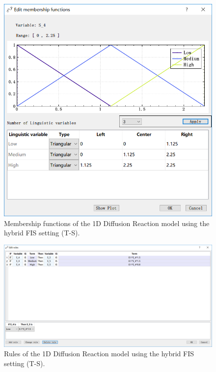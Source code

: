 \documentclass[journal,a4paper,onecolumn]{article}
\begin{document}
\begin{figure}[!hbt]
	\begin{center}
		\includegraphics[width=0.9\columnwidth]{fig39}
		\caption{Membership functions of the 1D Diffusion Reaction model using the hybrid FIS setting (T-S).}
		\label{fig:Membership functions of 1D Diffusion Reaction using hybrid FIS (T-S).}
	\end{center}
\end{figure}

\begin{figure}[!hbt]
	\begin{center}
		\includegraphics[width=\columnwidth]{fig40}
		\caption{Rules of the 1D Diffusion Reaction model using the hybrid FIS setting (T-S).}
		\label{fig:Rules of 1D Diffusion Reaction using hybrid FIS (T-S).}
	\end{center}
\end{figure}
\end{document}
